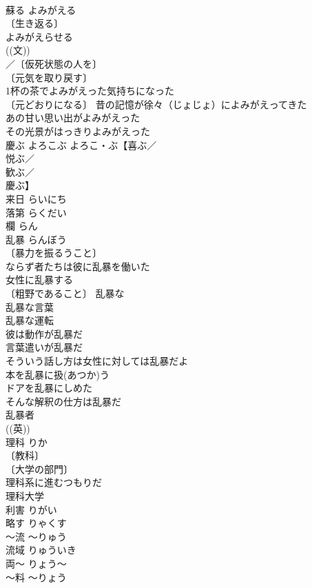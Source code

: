 \documentclass[8pt]{extreport}
\begin{document}
\begin{CJK}{UTF8}{min}
\\	蘇る	よみがえる	
\\	〔生き返る〕
\\	よみがえらせる 
\\	((文)) 
\\	／〔仮死状態の人を〕
\\	〔元気を取り戻す〕
\\	1杯の茶でよみがえった気持ちになった 
\\	〔元どおりになる〕 昔の記憶が徐々（じょじょ）によみがえってきた 
\\	あの甘い思い出がよみがえった 
\\	その光景がはっきりよみがえった 
\\	慶ぶ	よろこぶ	よろこ・ぶ【喜ぶ／
\\	悦ぶ／
\\	歓ぶ／
\\	慶ぶ】 
\\	来日	らいにち	
\\	落第	らくだい	
\\	欄	らん	
\\	乱暴	らんぼう	
\\	〔暴力を振るうこと〕
\\	ならず者たちは彼に乱暴を働いた 
\\	女性に乱暴する 
\\	〔粗野であること〕 乱暴な 
\\	乱暴な言葉 
\\	乱暴な運転 
\\	彼は動作が乱暴だ 
\\	言葉遣いが乱暴だ 
\\	そういう話し方は女性に対しては乱暴だよ 
\\	本を乱暴に扱(あつか)う 
\\	ドアを乱暴にしめた 
\\	そんな解釈の仕方は乱暴だ 
\\	乱暴者 
\\	((英)) 
\\	理科	りか	
\\	〔教科〕
\\	〔大学の部門〕
\\	理科系に進むつもりだ 
\\	理科大学 
\\	利害	りがい	
\\	略す	りゃくす	
\\	～流	～りゅう	
\\	流域	りゅういき	
\\	両～	りょう～	
\\	～料	～りょう	

\end{CJK}
\end{document}
